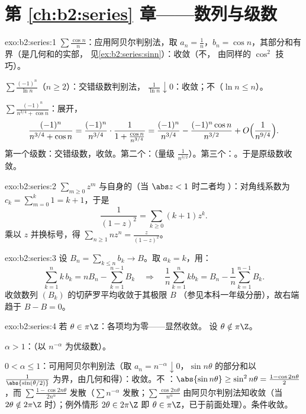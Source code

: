 \section*{第 \ref{ch:b2:series} 章——数列与级数}

\begin{solution}{exo:b2:series:1}
$\sum\frac{\cos n}{n}$：应用阿贝尔判别法，取 $a_n = \frac1n$，$b_n =
\cos n$，其部分和有界（是几何和的实部，
见\cref{ex:b2:series:sinn}）：收敛（不，
由同样的 $\cos^2$ 技巧）。

$\sum \frac{(-1)^n}{\ln n}$（$n \geq 2$）：交错级数判别法，
$\frac{1}{\ln n} \downarrow 0$：收敛；不（$\ln n
\leq n$）。

$\sum \frac{(-1)^n}{n^{3/4} + \cos n}$：展开，
\[
\frac{(-1)^n}{n^{3/4} + \cos n}
= \frac{(-1)^n}{n^{3/4}}\cdot
\frac{1}{1 + \frac{\cos n}{n^{3/4}}}
= \frac{(-1)^n}{n^{3/4}}
- \frac{(-1)^n\cos n}{n^{3/2}} + O\Bigl(\frac{1}{n^{9/4}}\Bigr).
\]
第一个级数：交错级数，收敛。第二个：（量级 $\frac{1}{n^{3/2}}$）。第三个：。于是原级数收敛。
\end{solution}

\begin{solution}{exo:b2:series:2}
$\sum_{m\geq0} z^m$ 与自身的（当 $\abs z < 1$ 时二者均
）：对角线系数为 $c_k =
\sum_{m=0}^{k} 1 = k + 1$，于是
\[
\frac{1}{(1-z)^2} = \sum_{k\geq0} (k+1)z^k .
\]
乘以 $z$ 并换标号，得 $\sum_{n \geq 1} n z^n =
\frac{z}{(1-z)^2}$。
\end{solution}

\begin{solution}{exo:b2:series:3}
设 $B_n = \sum_{k \leq n} b_k \to B$。取 $a_k = k$，用：
\[
\sum_{k=1}^{n} k\,b_k = n B_n - \sum_{k=1}^{n-1} B_k
\quad\Longrightarrow\quad
\frac1n \sum_{k=1}^{n} k b_k = B_n - \frac{1}{n}\sum_{k=1}^{n-1}
B_k .
\]
收敛数列 $(B_k)$ 的切萨罗平均收敛于其极限 $B$
（参见本科一年级分册），故右端趋于 $B - B = 0$。
\end{solution}

\begin{solution}{exo:b2:series:4}
若 $\theta \in \pi\Z$：各项均为零——显然收敛。
设 $\theta \notin \pi\Z$。

$\alpha > 1$：（以 $n^{-\alpha}$ 为优级数）。

$0 < \alpha \leq 1$：可用阿贝尔判别法（取 $a_n = n^{-\alpha}
\downarrow 0$，$\sin n\theta$ 的部分和以
$\frac{1}{\abs{\sin(\theta/2)}}$ 为界，由几何和得）：收敛。不
：$\abs{\sin n\theta} \geq \sin^2 n\theta = \frac{1 -
\cos 2n\theta}{2}$，而 $\sum \frac{1 - \cos 2n\theta}{2n^\alpha}$
发散（$\sum n^{-\alpha}$ 发散；$\sum
\frac{\cos 2n\theta}{n^\alpha}$ 由阿贝尔判别法知收敛（当 $2\theta
\notin 2\pi\Z$ 时）；例外情形 $2\theta \in 2\pi\Z$ 即
$\theta \in \pi\Z$，已于前面处理）。条件收敛。
\end{solution}

